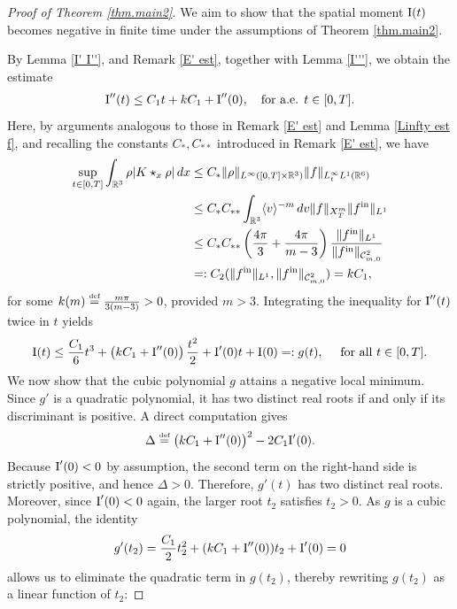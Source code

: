 \documentclass[reqno,11pt,final]{amsart}
\theoremstyle{plain}
\numberwithin{equation}{section}
\numberwithin{theorem}{section}
\newcommand{\eqdef }{\overset{\mbox{\tiny{def}}}{=}}
\begin{document}
\begin{proof}[Proof of Theorem \ref{thm.main2}] We aim to show that the spatial moment $\textup{I}(t)$ becomes negative in finite time under the assumptions of Theorem \ref{thm.main2}.

By Lemma \ref{I' I''}, and Remark \ref{E' est}, together with Lemma \ref{I'''}, we obtain the estimate
\begin{align*}
\textup{I}''(t)\le C_1t+kC_1+\textup{I}''(0), \quad \text{for a.e. }t\in[0,T].
\end{align*}Here, by arguments analogous to those in Remark \ref{E' est} and Lemma \ref{Linfty est f}, and recalling the constants $C_*, C_{**}$ introduced in Remark \ref{E' est}, we have
\begin{align*}
\sup_{t\in[0,T]} \int_{\mathbb{R}^3} \rho|K\star_x \rho|\,dx &\le C_*\| \rho\|_{L^\infty([0,T]\times\mathbb{R}^3)} \|f\|_{L^\infty_tL^1(\mathbb{R}^6)}\\
&\le C_*C_{**}\int_{\mathbb{R}^3}\langle v\rangle^{-m}\,dv \|f\|_{X_T^m} \|f^\textup{in}\|_{L^1}\\
&\le C_*C_{**} \left(\frac{4\pi}{3} + \frac{4\pi}{m-3}\right)\frac{\|f^\textup{in}\|_{L^1}}{\|f^\textup{in}\|_{\mathcal{C}^2_{m,0}}}\\
&=: C_2(\|f^\textup{in}\|_{L^1}, \|f^\textup{in}\|_{\mathcal{C}^2_{m,0}}) = k C_1,
\end{align*}for some $k(m) \eqdef \frac{m\pi}{3(m-3)}>0$, provided $m>3$. Integrating the inequality for $\textup{I}''(t)$ twice in $t$ yields
\begin{align*}
\textup{I}(t)\le \frac{C_1}{6}t^3+\left(kC_1+\textup{I}''(0)\right)\frac{t^2}{2}+\textup{I}'(0)t+\textup{I}(0)=:g(t), \quad \text{ for all }t\in[0,T].
\end{align*}We now show that the cubic polynomial $g$ attains a negative local minimum. Since $g'$ is a quadratic polynomial, it has two distinct real roots if and only if its
discriminant is positive. A direct computation gives
$$
\Delta \eqdef \bigl(kC_1 + \textup{I}''(0)\bigr)^2 - 2C_1 \textup{I}'(0).
$$
Because $\textup{I}'(0)<0$ by assumption, the second term on the right-hand side is strictly
positive, and hence $\Delta > 0$. 
Therefore, $g'(t)$ has two distinct real roots. Moreover, since $\textup{I}'(0)<0$ again, the larger
root $t_2$ satisfies $t_2>0$. As $g$ is a cubic polynomial, the identity $$g'(t_2)= \frac{C_1}{2}t_2^2 + (kC_1+\textup{I}''(0))t_2 + \textup{I}'(0)=0$$ allows us to
eliminate the quadratic term in $g(t_2)$, thereby rewriting $g(t_2)$ as a linear function of $t_2$:

\end{proof}
\end{document}
